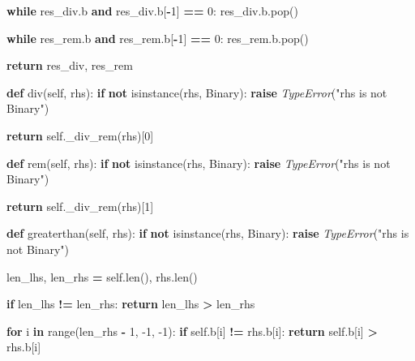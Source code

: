 \documentclass[
]{article}
\newenvironment{Shaded}{\begin{snugshade}}{\end{snugshade}}
\newcommand{\BuiltInTok}[1]{#1}
\newcommand{\ControlFlowTok}[1]{\textcolor[rgb]{0.13,0.29,0.53}{\textbf{#1}}}
\newcommand{\DecValTok}[1]{\textcolor[rgb]{0.00,0.00,0.81}{#1}}
\newcommand{\KeywordTok}[1]{\textcolor[rgb]{0.13,0.29,0.53}{\textbf{#1}}}
\newcommand{\NormalTok}[1]{#1}
\newcommand{\OperatorTok}[1]{\textcolor[rgb]{0.81,0.36,0.00}{\textbf{#1}}}
\newcommand{\PreprocessorTok}[1]{\textcolor[rgb]{0.56,0.35,0.01}{\textit{#1}}}
\newcommand{\StringTok}[1]{\textcolor[rgb]{0.31,0.60,0.02}{#1}}
\newcommand{\VariableTok}[1]{\textcolor[rgb]{0.00,0.00,0.00}{#1}}
\begin{document}
\begin{Shaded}
\begin{Highlighting}[]
{        \ControlFlowTok{while}\NormalTok{ res_div.b }\KeywordTok{and}\NormalTok{ res_div.b[}\OperatorTok{-}\DecValTok{1}\NormalTok{] }\OperatorTok{==} \DecValTok{0}\NormalTok{:}
\NormalTok{            res_div.b.pop()}
  
        \ControlFlowTok{while}\NormalTok{ res_rem.b }\KeywordTok{and}\NormalTok{ res_rem.b[}\OperatorTok{-}\DecValTok{1}\NormalTok{] }\OperatorTok{==} \DecValTok{0}\NormalTok{:}
\NormalTok{            res_rem.b.pop()}
  
        \ControlFlowTok{return}\NormalTok{ res_div, res_rem}
  
    \KeywordTok{def}\NormalTok{ div(}\VariableTok{self}\NormalTok{, rhs):}
        \ControlFlowTok{if} \KeywordTok{not} \BuiltInTok{isinstance}\NormalTok{(rhs, Binary):}
            \ControlFlowTok{raise} \PreprocessorTok{TypeError}\NormalTok{(}\StringTok{"rhs is not Binary"}\NormalTok{)}
  
        \ControlFlowTok{return} \VariableTok{self}\NormalTok{._div_rem(rhs)[}\DecValTok{0}\NormalTok{]}
  
    \KeywordTok{def}\NormalTok{ rem(}\VariableTok{self}\NormalTok{, rhs):}
        \ControlFlowTok{if} \KeywordTok{not} \BuiltInTok{isinstance}\NormalTok{(rhs, Binary):}
            \ControlFlowTok{raise} \PreprocessorTok{TypeError}\NormalTok{(}\StringTok{"rhs is not Binary"}\NormalTok{)}
  
        \ControlFlowTok{return} \VariableTok{self}\NormalTok{._div_rem(rhs)[}\DecValTok{1}\NormalTok{]}
  
    \KeywordTok{def}\NormalTok{ greaterthan(}\VariableTok{self}\NormalTok{, rhs):}
        \ControlFlowTok{if} \KeywordTok{not} \BuiltInTok{isinstance}\NormalTok{(rhs, Binary):}
            \ControlFlowTok{raise} \PreprocessorTok{TypeError}\NormalTok{(}\StringTok{"rhs is not Binary"}\NormalTok{)}
  
\NormalTok{        len_lhs, len_rhs }\OperatorTok{=} \VariableTok{self}\NormalTok{.}\BuiltInTok{len}\NormalTok{(), rhs.}\BuiltInTok{len}\NormalTok{()}
  
        \ControlFlowTok{if}\NormalTok{ len_lhs }\OperatorTok{!=}\NormalTok{ len_rhs:}
            \ControlFlowTok{return}\NormalTok{ len_lhs }\OperatorTok{>}\NormalTok{ len_rhs}
  
        \ControlFlowTok{for}\NormalTok{ i }\KeywordTok{in} \BuiltInTok{range}\NormalTok{(len_rhs }\OperatorTok{-} \DecValTok{1}\NormalTok{, }\DecValTok{-1}\NormalTok{, }\DecValTok{-1}\NormalTok{):}
            \ControlFlowTok{if} \VariableTok{self}\NormalTok{.b[i] }\OperatorTok{!=}\NormalTok{ rhs.b[i]:}
                \ControlFlowTok{return} \VariableTok{self}\NormalTok{.b[i] }\OperatorTok{>}\NormalTok{ rhs.b[i]}
  
}
\end{Highlighting}
\end{Shaded}
\end{document}
